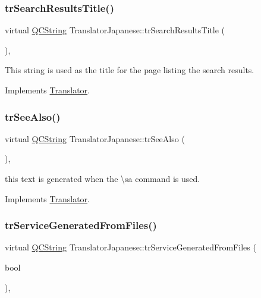 \subsubsection{\texorpdfstring{trSearchResultsTitle()}{trSearchResultsTitle()}}
{\footnotesize\ttfamily virtual \mbox{\hyperlink{class_q_c_string}{Q\+C\+String}} Translator\+Japanese\+::tr\+Search\+Results\+Title (\begin{DoxyParamCaption}{ }\end{DoxyParamCaption})\hspace{0.3cm}{\ttfamily [inline]}, {\ttfamily [virtual]}}

This string is used as the title for the page listing the search results. 

Implements \mbox{\hyperlink{class_translator}{Translator}}.

\mbox{\label{class_translator_japanese_ac1153821b3168a86be43711ca22ec72b}} 
\subsubsection{\texorpdfstring{trSeeAlso()}{trSeeAlso()}}
{\footnotesize\ttfamily virtual \mbox{\hyperlink{class_q_c_string}{Q\+C\+String}} Translator\+Japanese\+::tr\+See\+Also (\begin{DoxyParamCaption}{ }\end{DoxyParamCaption})\hspace{0.3cm}{\ttfamily [inline]}, {\ttfamily [virtual]}}

this text is generated when the \textbackslash{}sa command is used. 

Implements \mbox{\hyperlink{class_translator}{Translator}}.

\mbox{\label{class_translator_japanese_a534e4442a40c69f6d6062a15867be6ba}} 
\subsubsection{\texorpdfstring{trServiceGeneratedFromFiles()}{trServiceGeneratedFromFiles()}}
{\footnotesize\ttfamily virtual \mbox{\hyperlink{class_q_c_string}{Q\+C\+String}} Translator\+Japanese\+::tr\+Service\+Generated\+From\+Files (\begin{DoxyParamCaption}\item[{bool}]{ }\end{DoxyParamCaption})\hspace{0.3cm}{\ttfamily [inline]}, {\ttfamily [virtual]}}


